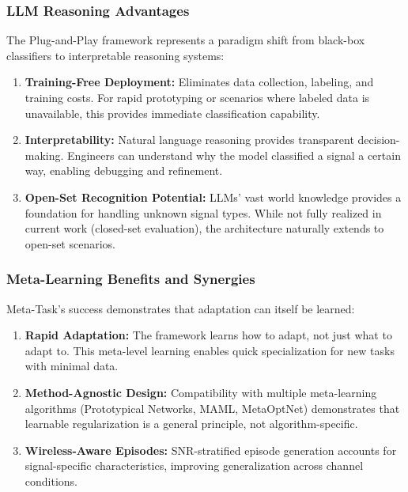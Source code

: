 \subsubsection{LLM Reasoning Advantages}

The Plug-and-Play framework represents a paradigm shift from black-box classifiers to interpretable reasoning systems:

\begin{enumerate}
    \item \textbf{Training-Free Deployment:} Eliminates data collection, labeling, and training costs. For rapid prototyping or scenarios where labeled data is unavailable, this provides immediate classification capability.
    
    \item \textbf{Interpretability:} Natural language reasoning provides transparent decision-making. Engineers can understand why the model classified a signal a certain way, enabling debugging and refinement.
    
    \item \textbf{Open-Set Recognition Potential:} LLMs' vast world knowledge provides a foundation for handling unknown signal types. While not fully realized in current work (closed-set evaluation), the architecture naturally extends to open-set scenarios.
\end{enumerate}

\subsubsection{Meta-Learning Benefits and Synergies}

Meta-Task's success demonstrates that adaptation can itself be learned:

\begin{enumerate}
    \item \textbf{Rapid Adaptation:} The framework learns how to adapt, not just what to adapt to. This meta-level learning enables quick specialization for new tasks with minimal data.
    
    \item \textbf{Method-Agnostic Design:} Compatibility with multiple meta-learning algorithms (Prototypical Networks, MAML, MetaOptNet) demonstrates that learnable regularization is a general principle, not algorithm-specific.
    
    \item \textbf{Wireless-Aware Episodes:} SNR-stratified episode generation accounts for signal-specific characteristics, improving generalization across channel conditions.
\end{enumerate}

